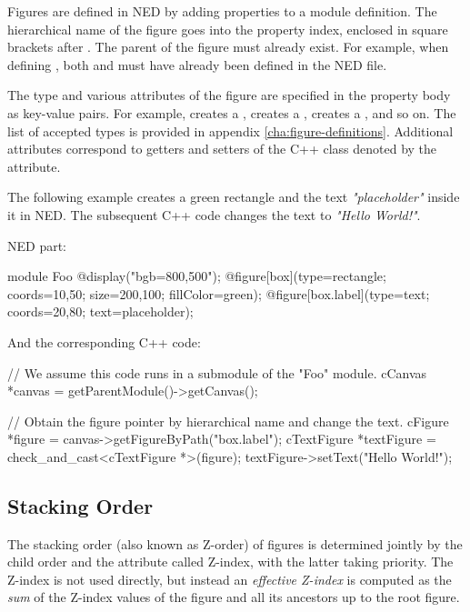 Figures are defined in NED by adding  properties to a module
definition. The hierarchical name of the figure goes into the property index,
enclosed in square brackets after . The parent of the figure must
already exist. For example, when defining , both  and
 must have already been defined in the NED file.

The type and various attributes of the figure are specified in the property body
as key-value pairs. For example,  creates a ,
 creates a , 
creates a , and so on. The list of accepted types is
provided in appendix \ref{cha:figure-definitions}. Additional attributes
correspond to getters and setters of the C++ class denoted by the 
attribute.

The following example creates a green rectangle and the text
\textit{"placeholder"} inside it in NED. The subsequent C++ code changes the
text to \textit{"Hello World!"}.

NED part:

\begin{ned}
module Foo
{
    @display("bgb=800,500");
    @figure[box](type=rectangle; coords=10,50; size=200,100; fillColor=green);
    @figure[box.label](type=text; coords=20,80; text=placeholder);
}
\end{ned}

And the corresponding C++ code:

\begin{cpp}
// We assume this code runs in a submodule of the "Foo" module.
cCanvas *canvas = getParentModule()->getCanvas();

// Obtain the figure pointer by hierarchical name and change the text.
cFigure *figure = canvas->getFigureByPath("box.label");
cTextFigure *textFigure = check_and_cast<cTextFigure *>(figure);
textFigure->setText("Hello World!");
\end{cpp}


\subsection{Stacking Order}
\label{sec:graphics:canvas-stacking-order}

The stacking order (also known as Z-order) of figures is determined jointly by
the child order and the  attribute called Z-index, with the
latter taking priority. The Z-index is not used directly, but instead an
\textit{effective Z-index} is computed as the \textit{sum} of the Z-index values
of the figure and all its ancestors up to the root figure.

